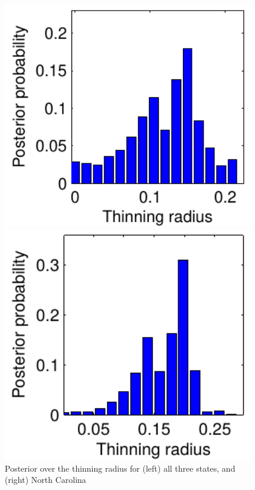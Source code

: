 \documentclass{statsoc}
\begin{document}
  \begin{figure}
  \centering
  \begin{minipage}[h]{0.23\linewidth}
  \caption{Posterior over the thinning radius for (left) all three states, and (right) North Carolina}
  \label{fig:grey_nc_in_rad}
  \end{minipage}
  \begin{minipage}[h]{0.28\linewidth}
    \centering
    \includegraphics[width=0.98\textwidth, angle=0]{figs/plot_NCSCGA_rad.pdf}
  \end{minipage}
  \begin{minipage}[h]{0.28\linewidth}
  \centering
    \includegraphics[width=0.98\textwidth, angle=0]{figs/plot_nc_rad_less_labels.pdf}
  \end{minipage}
  \end{figure}
\end{document}
